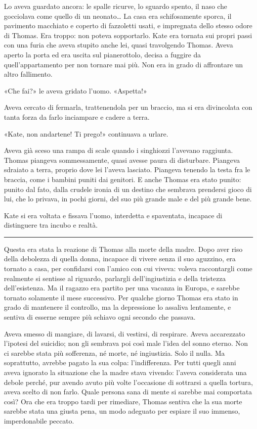 \documentclass[a4paper,oneside,9pt]{memoir}
\begin{document}
Lo aveva guardato ancora: le spalle ricurve, lo sguardo spento, il naso che gocciolava come quello di un neonato\dots{}
La casa era schifosamente sporca, il pavimento macchiato e coperto di fazzoletti usati, e impregnata dello stesso odore
di Thomas. Era troppo: non poteva sopportarlo. Kate era tornata sui propri passi con una furia che aveva stupito anche
lei, quasi travolgendo Thomas. Aveva aperto la porta ed era uscita sul pianerottolo, decisa a fuggire da
quell'appartamento per non tornare mai più. Non era in grado di affrontare un altro fallimento.

«Che fai?» le aveva gridato l'uomo. «Aspetta!»

Aveva cercato di fermarla, trattenendola per un braccio, ma si era divincolata con tanta forza da farlo inciampare e
cadere a terra.

«Kate, non andartene! Ti prego!» continuava a urlare.

Aveva già sceso una rampa di scale quando i singhiozzi l'avevano raggiunta. Thomas piangeva sommessamente, quasi avesse
paura di disturbare. Piangeva sdraiato a terra, proprio dove lei l'aveva lasciato. Piangeva tenendo la testa fra le
braccia, come i bambini puniti dai genitori. E anche Thomas era stato punito: punito dal fato, dalla crudele ironia di
un destino che sembrava prendersi gioco di lui, che lo privava, in pochi giorni, del suo più grande male e del più
grande bene.

Kate si era voltata e fissava l'uomo, interdetta e spaventata, incapace di distinguere tra incubo e realtà.

\plainbreak{1}

Questa era stata la reazione di Thomas alla morte della madre. Dopo aver riso della debolezza di quella donna, incapace
di vivere senza il suo aguzzino, era tornato a casa, per confidarsi con l'amico con cui viveva: voleva raccontargli come
realmente si sentisse al riguardo, parlargli dell'ingiustizia e della tristezza dell'esistenza. Ma il ragazzo era
partito per una vacanza in Europa, e sarebbe tornato solamente il mese successivo. Per qualche giorno Thomas era stato
in grado di mantenere il controllo, ma la depressione lo assaliva lentamente, e sentiva di esserne sempre più schiavo
ogni secondo che passava.

Aveva smesso di mangiare, di lavarsi, di vestirsi, di respirare. Aveva accarezzato l'ipotesi del suicidio; non gli
sembrava poi così male l'idea del sonno eterno. Non ci sarebbe stata più sofferenza, né morte, né ingiustizia. Solo il
nulla. Ma soprattutto, avrebbe pagato la sua colpa: l'indifferenza. Per tutti quegli anni aveva ignorato la situazione
che la madre stava vivendo: l'aveva considerata una debole perché, pur avendo avuto più volte l'occasione di sottrarsi a
quella tortura, aveva scelto di non farlo. Quale persona sana di mente si sarebbe mai comportata così? Ora che era
troppo tardi per rimediare, Thomas sentiva che la sua morte sarebbe stata una giusta pena, un modo adeguato per espiare
il suo immenso, imperdonabile peccato.
\end{document}
